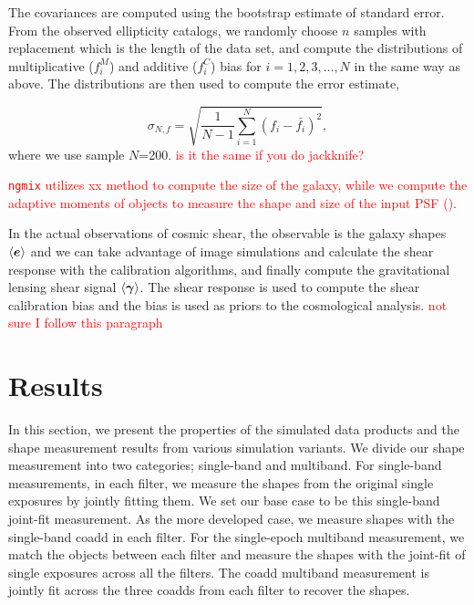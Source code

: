 \documentclass[fleqn,usenatbib]{mnras}
\begin{document}
The covariances are computed using the bootstrap estimate of standard error. From the observed ellipticity catalogs, we randomly choose $n$ samples with replacement which is the length of the data set, and compute the distributions of multiplicative ($f^{M}_{i}$) and additive ($f^{C}_{i}$) bias for $i=1,2,3,...,N$ in the same way as above. The distributions are then used to compute the error estimate,  


\begin{equation}
    \sigma_{N,f} = \sqrt{\frac{1}{N-1} \sum_{i=1}^{N}(f_{i}-\bar{f_{i}})^{2}}, 
\end{equation}
where we use sample $N$=200.  \textcolor{red}{is it the same if you do jackknife?}

\textcolor{red}{\texttt{ngmix} utilizes xx method to compute the size of the galaxy, while we compute the adaptive moments of objects to measure the shape and size of the input PSF (\citealt{2003MNRAS.343..459H})}. 

In the actual observations of cosmic shear, the observable is the galaxy shapes $\langle\vb*{e}\rangle$ and we can take advantage of image simulations and calculate the shear response with the calibration algorithms, and finally compute the gravitational lensing shear signal $\langle\vb*{\gamma}\rangle$. The shear response is used to compute the shear calibration bias and the bias is used as priors to the cosmological analysis.  \textcolor{red}{not sure I follow this paragraph}


\section{Results}
\label{sec:results}
In this section, we present the properties of the simulated data products and the shape measurement results from various simulation variants. We divide our shape measurement into two categories; single-band and multiband. For single-band measurements, in each filter, we measure the shapes from the original single exposures by jointly fitting them. We set our base case to be this single-band joint-fit measurement. As the more developed case, we measure shapes with the single-band coadd in each filter. For the single-epoch multiband measurement, we match the objects between each filter and measure the shapes with the joint-fit of single exposures across all the filters. The coadd multiband measurement is jointly fit across the three coadds from each filter to recover the shapes. 
\end{document}
